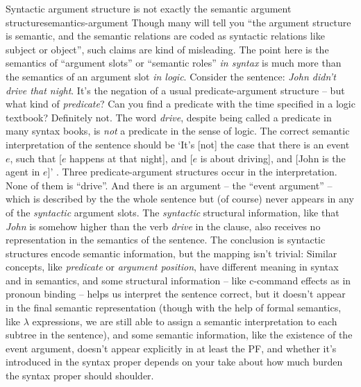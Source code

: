 \documentclass[UTF8, a4paper, oneside, scheme=plain]{ctexrep}
\newcommand*{\term}[1]{\emph{#1}}
\newcommand{\corpus}[1]{\emph{#1}}
\newcommand{\translate}[1]{`#1'}
\begin{document}
\begin{theorybox}{Syntactic argument structure is not exactly the semantic argument structure}{semantics-argument}
    Though many will tell you ``the argument structure is semantic, 
    and the semantic relations are coded as syntactic relations like subject or object'',
    such claims are kind of misleading.
    The point here is the semantics of ``argument slots'' or ``semantic roles'' \emph{in syntax}
    is much more than the semantics of an argument slot \emph{in logic}.
    Consider the sentence: \corpus{John didn't drive that night}. 
    It's the negation of a usual predicate-argument structure
    -- but what kind of \term{predicate}?
    Can you find a predicate with the time specified in a logic textbook?
    Definitely not. 
    The word \corpus{drive}, despite being called a predicate in many syntax books,
    is \emph{not} a predicate in the sense of logic.
    The correct semantic interpretation of the sentence should be 
    \translate{It's [not] the case that there is an event $e$, such that
    [$e$ happens at that night], and [$e$ is about driving], 
    and [John is the agent in $e$]} \citep{zeijlstra2013}.
    Three predicate-argument structures occur in the interpretation.
    None of them is ``drive''.
    And there is an argument -- the ``event argument'' --
    which is described by the the whole sentence but (of course) 
    never appears in any of the \emph{syntactic} argument slots.
    The \emph{syntactic} structural information,
    like that \corpus{John} is somehow higher than the verb \corpus{drive} in the clause,
    also receives no representation in the semantics of the sentence.
    The conclusion is syntactic structures encode semantic information,
    but the mapping isn't trivial:
    Similar concepts, like \term{predicate} or \term{argument position},
    have different meaning in syntax and in semantics, and 
    some structural information -- like c-command effects as in pronoun binding --
    helps us interpret the sentence correct,
    but it doesn't appear in the final semantic representation 
    (though with the help of formal semantics, like $\lambda$ expressions,
    we are still able to assign a semantic interpretation to each subtree in the sentence),
    and some semantic information, like the existence of the event argument,
    doesn't appear explicitly in at least the PF, 
    and whether it's introduced in the syntax proper depends on 
    your take about how much burden the syntax proper should shoulder.
\end{theorybox}
\end{document}
